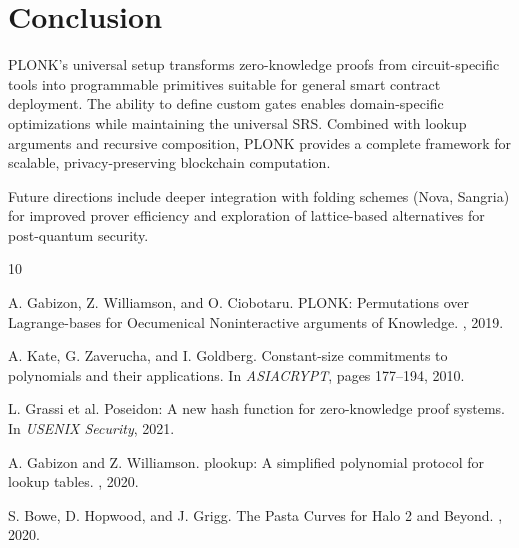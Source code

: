 \documentclass[11pt,a4paper]{article}
\begin{document}
\section{Conclusion}

PLONK's universal setup transforms zero-knowledge proofs from circuit-specific tools into programmable primitives suitable for general smart contract deployment. The ability to define custom gates enables domain-specific optimizations while maintaining the universal SRS. Combined with lookup arguments and recursive composition, PLONK provides a complete framework for scalable, privacy-preserving blockchain computation.

Future directions include deeper integration with folding schemes (Nova, Sangria) for improved prover efficiency and exploration of lattice-based alternatives for post-quantum security.


\begin{thebibliography}{10}

A. Gabizon, Z. Williamson, and O. Ciobotaru.
\newblock PLONK: Permutations over Lagrange-bases for Oecumenical Noninteractive arguments of Knowledge.
, 2019.

A. Kate, G. Zaverucha, and I. Goldberg.
\newblock Constant-size commitments to polynomials and their applications.
\newblock In {\em ASIACRYPT}, pages 177--194, 2010.

L. Grassi et al.
\newblock Poseidon: A new hash function for zero-knowledge proof systems.
\newblock In {\em USENIX Security}, 2021.

A. Gabizon and Z. Williamson.
\newblock plookup: A simplified polynomial protocol for lookup tables.
, 2020.

S. Bowe, D. Hopwood, and J. Grigg.
\newblock The Pasta Curves for Halo 2 and Beyond.
, 2020.

\end{thebibliography}
\end{document}

